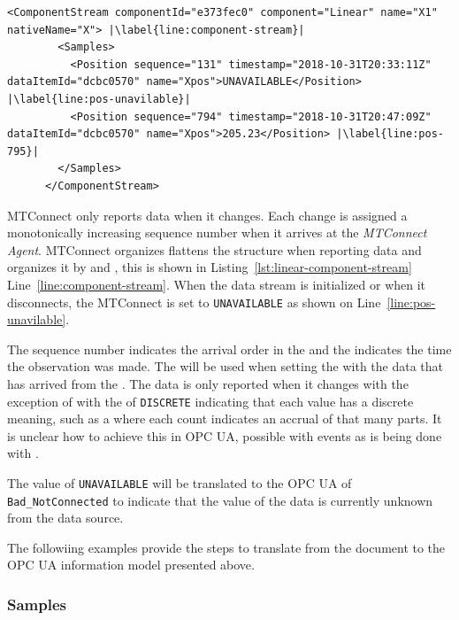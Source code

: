 \begin{lstlisting}[firstnumber=last,escapechar=|,%
    caption={Comoonent Stream},label={lst:component-stream}]
      <ComponentStream componentId="e373fec0" component="Linear" name="X1" nativeName="X"> |\label{line:component-stream}|
        <Samples>
          <Position sequence="131" timestamp="2018-10-31T20:33:11Z" dataItemId="dcbc0570" name="Xpos">UNAVAILABLE</Position> |\label{line:pos-unavilable}|
          <Position sequence="794" timestamp="2018-10-31T20:47:09Z" dataItemId="dcbc0570" name="Xpos">205.23</Position> |\label{line:pos-795}|
        </Samples>
      </ComponentStream>
\end{lstlisting}

MTConnect only reports data when it changes. Each change is assigned a monotonically increasing sequence number when it arrives at the \textit{MTConnect Agent}. MTConnect organizes flattens the structure when reporting data and organizes it by  and , this is shown in  Listing~\ref{lst:linear-component-stream} Line~\ref{line:component-stream}. When the data stream is initialized or when it disconnects, the MTConnect  is set to \texttt{UNAVAILABLE} as shown on Line~\ref{line:pos-unavilable}.

The sequence number indicates the arrival order in the  and the  indicates the time the observation was made. The  will be used when setting the  with the data that has arrived from the . The data is only reported when it changes with the exception of  with the  of \texttt{DISCRETE} indicating that each value has a discrete meaning, such as a  where each count indicates an accrual of that many parts. {\color{red} It is unclear how to achieve this in OPC UA, possible with events as is being done with }.

The value of \texttt{UNAVAILABLE} will be translated to the OPC UA   of \texttt{Bad_NotConnected} to indicate that the value of the data is currently unknown from the data source. 

The followiing examples provide the steps to translate from the  document to the OPC UA information model presented above.

\subsubsection{Samples}

